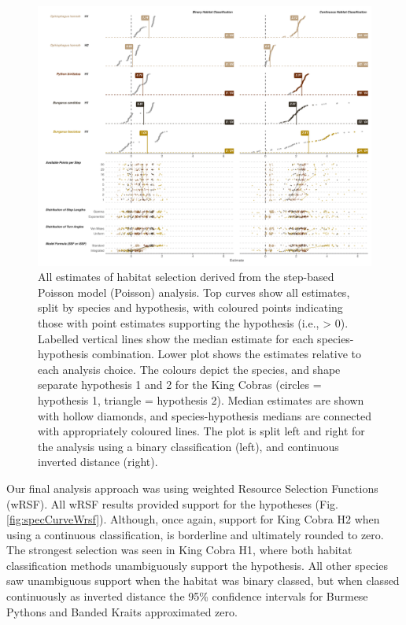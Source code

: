 \documentclass[10pt,a4paper]{article}
\begin{document}
\begin{figure}
\includegraphics[width=1\linewidth]{../../figures/specCurve_pois} \caption{All estimates of habitat selection derived from the step-based Poisson model (Poisson) analysis. Top curves show all estimates, split by species and hypothesis, with coloured points indicating those with point estimates supporting the hypothesis (i.e., > 0). Labelled vertical lines show the median estimate for each species-hypothesis combination. Lower plot shows the estimates relative to each analysis choice. The colours depict the species, and shape separate hypothesis 1 and 2 for the King Cobras (circles = hypothesis 1, triangle = hypothesis 2). Median estimates are shown with hollow diamonds, and species-hypothesis medians are connected with appropriately coloured lines. The plot is split left and right for the analysis using a binary classification (left), and continuous inverted distance (right).}\label{fig:specCurvePois}
\end{figure}

Our final analysis approach was using weighted Resource Selection Functions (wRSF).
All wRSF results provided support for the hypotheses (Fig. \ref{fig:specCurveWrsf}).
Although, once again, support for King Cobra H2 when using a continuous classification, is borderline and ultimately rounded to zero.
The strongest selection was seen in King Cobra H1, where both habitat classification methods unambiguously support the hypothesis.
All other species saw unambiguous support when the habitat was binary classed, but when classed continuously as inverted distance the 95\% confidence intervals for Burmese Pythons and Banded Kraits approximated zero.
\end{document}
